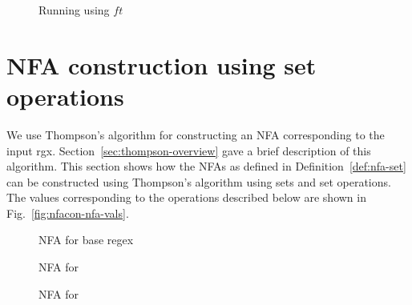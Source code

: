 \begin{figure}
  \centering
  
  \caption{Running  using $ft$}
  \label{fig:re-ft-nfa-run-detail}
\end{figure}

\section{NFA construction using set operations} \label{sec:nfacon-set}
We use Thompson's algorithm for constructing an \gls{NFA}
corresponding to the input \gls{rgx}.
Section~\ref{sec:thompson-overview} gave a brief description of this
algorithm.
This section shows how the \glspl{NFA} as defined in
Definition~\ref{def:nfa-set} can be constructed using Thompson's
algorithm using sets and set operations.
The  values corresponding to the operations described below
are shown in Fig.~\ref{fig:nfacon-nfa-vals}.

\begin{figure}
  \centering
  
  \caption{NFA for base regex}
  \label{fa:con-base}
\end{figure}

%   

\begin{figure}
  \centering
  
  \caption{NFA for }
  \label{fa:con-alt}
\end{figure}

\begin{figure}
  \centering
  
  \caption{NFA for }
  \label{fa:con-plus}
\end{figure}



